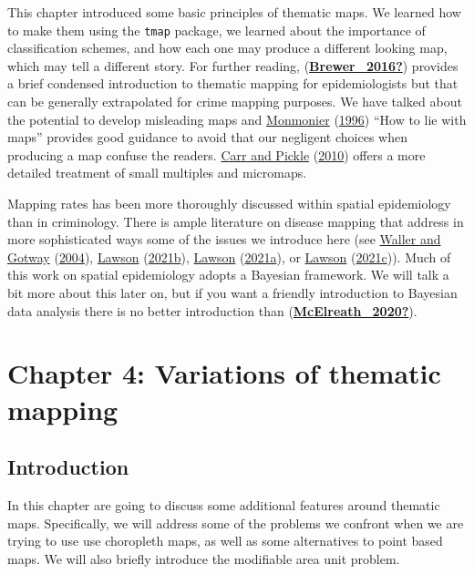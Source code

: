 \documentclass[
]{book}
\begin{document}
This chapter introduced some basic principles of thematic maps. We learned how to make them using the \texttt{tmap} package, we learned about the importance of classification schemes, and how each one may produce a different looking map, which may tell a different story. For further reading, (\protect\hyperlink{ref-Brewer_2016}{\textbf{Brewer\_2016?}}) provides a brief condensed introduction to thematic mapping for epidemiologists but that can be generally extrapolated for crime mapping purposes. We have talked about the potential to develop misleading maps and \protect\hyperlink{ref-Monmonier_1996}{Monmonier} (\protect\hyperlink{ref-Monmonier_1996}{1996}) ``How to lie with maps'' provides good guidance to avoid that our negligent choices when producing a map confuse the readers. \protect\hyperlink{ref-Carr_2010}{Carr and Pickle} (\protect\hyperlink{ref-Carr_2010}{2010}) offers a more detailed treatment of small multiples and micromaps.

Mapping rates has been more thoroughly discussed within spatial epidemiology than in criminology. There is ample literature on disease mapping that address in more sophisticated ways some of the issues we introduce here (see \protect\hyperlink{ref-Waller_2004}{Waller and Gotway} (\protect\hyperlink{ref-Waller_2004}{2004}), \protect\hyperlink{ref-Lawson_2006}{Lawson} (\protect\hyperlink{ref-Lawson_2006}{2021b}), \protect\hyperlink{ref-Lawson_2021a}{Lawson} (\protect\hyperlink{ref-Lawson_2021a}{2021a}), or \protect\hyperlink{ref-Lawson_2021b}{Lawson} (\protect\hyperlink{ref-Lawson_2021b}{2021c})). Much of this work on spatial epidemiology adopts a Bayesian framework. We will talk a bit more about this later on, but if you want a friendly introduction to Bayesian data analysis there is no better introduction than (\protect\hyperlink{ref-McElreath_2020}{\textbf{McElreath\_2020?}}).

\hypertarget{chapter-4-variations-of-thematic-mapping}{%
\chapter{Chapter 4: Variations of thematic mapping}\label{chapter-4-variations-of-thematic-mapping}}

\hypertarget{introduction-3}{%
\section{Introduction}\label{introduction-3}}

In this chapter are going to discuss some additional features around thematic maps. Specifically, we will address some of the problems we confront when we are trying to use use choropleth maps, as well as some alternatives to point based maps. We will also briefly introduce the modifiable area unit problem.
\end{document}

